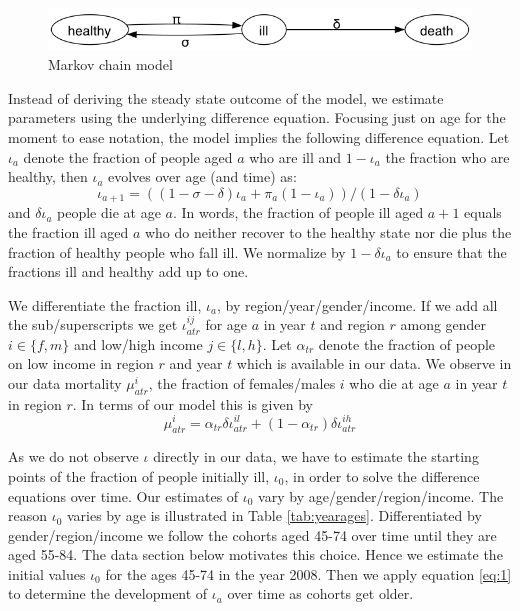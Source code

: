 \documentclass[a4paper,12pt]{article}
\begin{document}
\begin{figure}[htbp]
\centering
\includegraphics[width=.9\linewidth]{./figures/markov_chain.png}
\caption{\label{fig:markov}Markov chain model}
\end{figure}

Instead of deriving the steady state outcome of the model, we estimate parameters using the underlying difference equation. Focusing just on age for the moment to ease notation, the model implies the following difference equation. Let \(\iota_a\) denote the fraction of people aged \(a\) who are ill and \(1-\iota_a\) the fraction who are healthy, then \(\iota_a\) evolves over age (and time) as:
\begin{equation}
\label{eq:1}
\iota_{a+1} = ((1-\sigma-\delta) \iota_a + \pi_a (1-\iota_a))/(1-\delta \iota_{a})
\end{equation}
and \(\delta \iota_a\) people die at age \(a\). In words, the fraction of people ill aged \(a+1\) equals the fraction ill aged \(a\) who do neither recover to the healthy state nor die plus the fraction of healthy people who fall ill. We normalize by \(1-\delta \iota_a\) to ensure that the fractions ill and healthy add up to one.

We differentiate the fraction ill, \(\iota_a\), by region/year/gender/income. If we add all the sub/superscripts we get \(\iota_{atr}^{ij}\) for age \(a\) in year \(t\) and region \(r\) among gender \(i \in \{f,m\}\) and low/high income \(j \in \{l,h\}\). Let \(\alpha_{tr}\) denote the fraction of people on low income in region \(r\) and year \(t\) which is available in our data. We observe in our data mortality \(\mu_{atr}^{i}\), the fraction of females/males \(i\) who die at age \(a\) in year \(t\) in region \(r\). In terms of our model this is given by
\begin{equation}
\label{eq:2}
\mu_{atr}^i = \alpha_{tr} \delta \iota_{atr}^{il} + (1-\alpha_{tr}) \delta \iota_{atr}^{ih}
\end{equation}

As we do not observe \(\iota\) directly in our data, we have to estimate the starting points of the fraction of people initially ill, \(\iota_0\), in order to solve the difference equations over time. Our estimates of \(\iota_0\) vary by age/gender/region/income. The reason \(\iota_0\) varies by age is illustrated in Table \ref{tab:yearages}. Differentiated by gender/region/income we follow the cohorts aged 45-74 over time until they are aged 55-84. The data section below motivates this choice. Hence we estimate the initial values \(\iota_0\) for the ages 45-74 in the year 2008. Then we apply equation \eqref{eq:1} to determine the development of \(\iota_a\) over time as cohorts get older.
\end{document}
